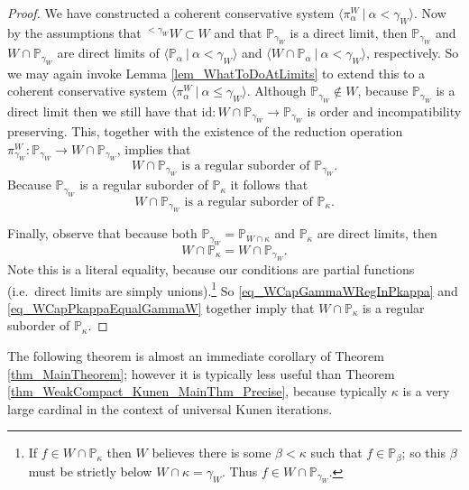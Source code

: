 \documentclass{amsart}
\begin{document}
\begin{proof}
We have constructed a coherent conservative system $\langle \pi^W_\alpha \ | \ \alpha < \gamma_W \rangle$.  Now by the assumptions that ${}^{<\gamma_W} W \subset W$ and that $\mathbb{P}_{\gamma_W}$ is a direct limit, then $\mathbb{P}_{\gamma_W}$ and $W \cap \mathbb{P}_{\gamma_W}$ are direct limits of $\langle \mathbb{P}_\alpha \ | \ \alpha < \gamma_W \rangle$ and $\langle W \cap \mathbb{P}_\alpha \ | \ \alpha < \gamma_W \rangle$, respectively.  So we may again invoke Lemma \ref{lem_WhatToDoAtLimits} to extend this to a coherent conservative system $\langle \pi^W_\alpha \ | \ \alpha \le \gamma_W \rangle$.  Although $\mathbb{P}_{\gamma_W} \notin W$, because $\mathbb{P}_{\gamma_W}$ is a direct limit then we still have that $\text{id}: W \cap \mathbb{P}_{\gamma_W} \to \mathbb{P}_{\gamma_W}$ is order and incompatibility preserving.  This, together with the existence of the reduction operation $\pi^W_{\gamma_W}: \mathbb{P}_{\gamma_W} \to W \cap \mathbb{P}_{\gamma_W}$, implies that 
\begin{equation*}
W \cap \mathbb{P}_{\gamma_W} \text{ is a regular suborder of } \mathbb{P}_{\gamma_W}.
\end{equation*}
Because $\mathbb{P}_{\gamma_W}$ is a regular suborder of $\mathbb{P}_\kappa$ it follows that
\begin{equation}\label{eq_WCapGammaWRegInPkappa}
W \cap \mathbb{P}_{\gamma_W} \text{ is a regular suborder of } \mathbb{P}_\kappa.
\end{equation}

Finally, observe that because both $\mathbb{P}_{\gamma_W}=\mathbb{P}_{W \cap \kappa}$ and $\mathbb{P}_\kappa$ are direct limits, then
\begin{equation}\label{eq_WCapPkappaEqualGammaW}
W \cap \mathbb{P}_\kappa = W \cap \mathbb{P}_{\gamma_W}.
\end{equation}
Note this is a literal equality, because our conditions are partial functions (i.e.\ direct limits are simply unions).\footnote{If $f \in W \cap \mathbb{P}_\kappa$ then $W$ believes there is some $\beta < \kappa$ such that $f \in \mathbb{P}_\beta$; so this $\beta$ must be strictly below $W \cap \kappa = \gamma_W$.  Thus $f \in W \cap \mathbb{P}_{\gamma_W}$.}  So \eqref{eq_WCapGammaWRegInPkappa} and \eqref{eq_WCapPkappaEqualGammaW} together imply that $W \cap \mathbb{P}_\kappa$ is a regular suborder of $\mathbb{P}_\kappa$.
\end{proof}

The following theorem is almost an immediate corollary of Theorem \ref{thm_MainTheorem}; however it is typically less useful than Theorem \ref{thm_WeakCompact_Kunen_MainThm_Precise}, because typically $\kappa$ is a very large cardinal in the context of universal Kunen iterations.
\end{document}
